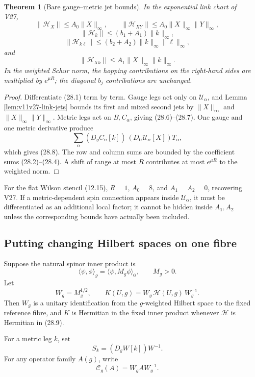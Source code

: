 \documentclass[11pt]{article}
\newtheorem{theorem}{Theorem}[section]
\begin{document}
\begin{theorem}[Bare gauge--metric jet bounds]
\label{thm:v11v28-bare-jets}
In the exponential link chart of V27,
\[
 \|\mathscr H_X\|
 \leq A_0\|X\|_\infty,
 \qquad
 \|\mathscr H_{XY}\|
 \leq A_0\|X\|_\infty\|Y\|_\infty,
 \tag{28.5}
\]
\[
 \|\mathscr H_k\|
 \leq(b_1+A_1)\|k\|_\infty,
 \tag{28.6}
\]
\[
 \|\mathscr H_{k\ell}\|
 \leq(b_2+A_2)\|k\|_\infty\|\ell\|_\infty,
 \tag{28.7}
\]
and
\[
 \|\mathscr H_{Xk}\|
 \leq A_1\|X\|_\infty\|k\|_\infty.
 \tag{28.8}
\]
In the weighted Schur norm, the hopping contributions on the
right-hand sides are multiplied by \(e^{\mu R}\); the diagonal
\(b_j\) contributions are unchanged.
\end{theorem}

\begin{proof}
Differentiate (28.1) term by term.  Gauge legs act only on
\(\mathcal U_\alpha\), and Lemma \ref{lem:v11v27-link-jets} bounds its
first and mixed second jets by \(\|X\|_\infty\) and
\(\|X\|_\infty\|Y\|_\infty\).  Metric legs act on \(B,C_\alpha\), giving
(28.6)--(28.7).  One gauge and one metric derivative produce
\[
 \sum_\alpha
 (D_gC_\alpha[k])\,
 (D_U\mathcal U_\alpha[X])T_\alpha,
\]
which gives (28.8).  The row and column sums are bounded by the
coefficient sums (28.2)--(28.4).  A shift of range at most \(R\)
contributes at most \(e^{\mu R}\) to the weighted norm.
\end{proof}

For the flat Wilson stencil (12.15), \(R=1\), \(A_0=8\), and
\(A_1=A_2=0\), recovering V27.  If a metric-dependent spin connection
appears inside \(\mathcal U_\alpha\), it must be differentiated as an
additional local factor; it cannot be hidden inside \(A_1,A_2\) unless
the corresponding bounds have actually been included.

\subsection{Putting changing Hilbert spaces on one fibre}

Suppose the natural spinor inner product is
\[
 \langle\psi,\phi\rangle_g
 =
 \langle\psi,M_g\phi\rangle_0,
 \qquad M_g>0.
 \tag{28.9}
\]
Let
\[
 W_g=M_g^{1/2},\qquad
 K(U,g)=W_g\,\mathscr H(U,g)\,W_g^{-1}.
 \tag{28.10}
\]
Then \(W_g\) is a unitary identification from the \(g\)-weighted Hilbert
space to the fixed reference fibre, and \(K\) is Hermitian in the fixed
inner product whenever \(\mathscr H\) is Hermitian in (28.9).

For a metric leg \(k\), set
\[
 S_k=(D_gW[k])W^{-1}.
 \tag{28.11}
\]
For any operator family \(A(g)\), write
\[
 \mathcal C_g(A)=W_gAW_g^{-1}.
 \tag{28.12}
\]
\end{document}
